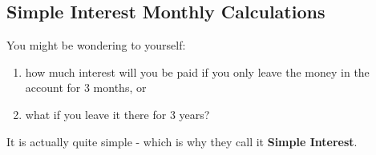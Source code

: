             \subsection{ Simple Interest Monthly Calculations}
            \nopagebreak
        \label{m39332*id69658}You might be wondering to yourself:\par 
        \label{m39332*id69662}\begin{enumerate}[noitemsep, label=\textbf{\arabic*}. ] 
            \label{m39332*uid30}\item how much interest will you be paid if you only leave the money in the account for 3 months, or
\label{m39332*uid31}\item what if you leave it there for 3 years?
\end{enumerate}
        \label{m39332*id69691}
It is actually quite simple - which is why they call it \textbf{Simple Interest}.\par 
